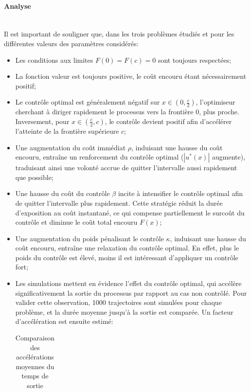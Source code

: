 \paragraph{Analyse}\phantom{}\\
Il est important de souligner que, dans les trois problèmes étudiés et pour les différentes valeurs des paramètres considérés:
\begin{itemize}
    \item Les conditions aux limites $F(0)=F(c)=0$ sont toujours respectées;
    \item La fonction valeur est toujours positive, le coût encouru étant nécessairement positif;
    \item Le contrôle optimal est généralement négatif sur \( x \in \left(0, \frac{c}{2}\right) \), l'optimiseur cherchant à diriger rapidement le processus vers la frontière \( 0 \), plus proche. Inversement, pour \( x \in \left(\frac{c}{2}, c\right) \), le contrôle devient positif afin d'accélérer l'atteinte de la frontière supérieure \( c \);
    \item Une augmentation du coût immédiat $\rho$, induisant une hausse du coût encouru, entraîne un renforcement du contrôle optimal ($|u^*(x)|$ augmente), traduisant ainsi une volonté accrue de quitter l'intervalle aussi rapidement que possible;
    \item Une hausse du coût du contrôle $\beta$ incite à intensifier le contrôle optimal afin de quitter l'intervalle plus rapidement. Cette stratégie réduit la durée d'exposition au coût instantané, ce qui compense partiellement le surcoût du contrôle et diminue le coût total encouru $F(x)$;
    \item Une augmentation du poids pénalisant le contrôle $\kappa$, induisant une hausse du coût encouru, entraîne une relaxation du contrôle optimal. En effet, plus le poids du contrôle est élevé, moins il est intéressant d'appliquer un contrôle fort;
    \item Les simulations mettent en évidence l'effet du contrôle optimal, qui accélère significativement la sortie du processus par rapport au cas non contrôlé. Pour valider cette observation, 1000 trajectoires sont simulées pour chaque problème, et la durée moyenne jusqu'à la sortie est comparée. Un facteur d'accélération est ensuite estimé:
    \begin{table}[htb]
        \centering
        \caption{Comparaison des accélérations moyennes du temps de sortie}\label{tab:acceleration_results}
        \renewcommand{\arraystretch}{1.1}
        \begin{tabular}{||c|c||}

\end{tabular}
\end{table}
\end{itemize}

